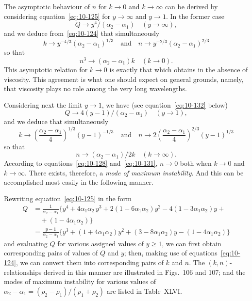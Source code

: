 The asymptotic behaviour of $n$ for $k \to 0$ and $k \to \infty$ can be derived by considering equation~\eqref{eq:10-125} for $y \to \infty$ and $y \to 1$. In the former case
\begin{equation}
\label{eq:10-126}
Q \to y^4/(\alpha_2-\alpha_1) \quad (y \to \infty),
\end{equation}
and we deduce from~\eqref{eq:10-124} that simultaneously
\begin{equation}
\label{eq:10-127}
k \to y^{-4/3}(\alpha_2-\alpha_1)^{1/3} \quad\text{and}\quad n \to y^{-2/3}(\alpha_2-\alpha_1)^{2/3}
\end{equation}
so that
\begin{equation}
\label{eq:10-128}
n^3 \to (\alpha_2-\alpha_1)k \quad (k \to 0).
\end{equation}
This asymptotic relation for $k \to 0$ is exactly that which obtains in the absence of viscosity. This agreement is what one should expect on general grounds, namely, that viscosity plays no role among the very long wavelengths.

Considering next the limit $y \to 1$, we have (see equation~\eqref{eq:10-132} below)
\begin{equation}
\label{eq:10-129}
Q \to 4(y-1)/(\alpha_2-\alpha_1) \quad (y \to 1),
\end{equation}
and we deduce that simultaneously
\begin{equation}
\label{eq:10-130}
k \to \left(\frac{\alpha_2-\alpha_1}{4}\right)^{1/3}\!(y-1)^{-1/3} \quad\text{and}\quad n \to 2\!\left(\frac{\alpha_2-\alpha_1}{4}\right)^{2/3}\!(y-1)^{1/3}
\end{equation}
so that
\begin{equation}
\label{eq:10-131}
n \to (\alpha_2-\alpha_1)/2k \quad (k \to \infty).
\end{equation}
According to equations~\eqref{eq:10-128} and~\eqref{eq:10-131}, $n \to 0$ both when $k \to 0$ and $k \to \infty$. There exists, therefore, a \emph{mode of maximum instability}. And this can be accomplished most easily in the following manner.

Rewriting equation~\eqref{eq:10-125} in the form
\begin{align}
\label{eq:10-132}
Q &= \frac{1}{\alpha_2-\alpha_1}\{y^4+4\alpha_1\alpha_2\,y^3+2(1-6\alpha_1\alpha_2)y^2 - 4(1-3\alpha_1\alpha_2)y + {} \nonumber\\
&\quad {}+ (1-4\alpha_1\alpha_2)\} \nonumber\\
&= \frac{y-1}{\alpha_2-\alpha_1}\{y^3+(1+4\alpha_1\alpha_2)y^2+(3-8\alpha_1\alpha_2)y - (1-4\alpha_1\alpha_2)\}
\end{align}
and evaluating $Q$ for various assigned values of $y \geqslant 1$, we can first obtain corresponding pairs of values of $Q$ and $y$; then, making use of equations~\eqref{eq:10-124}, we can convert them into corresponding pairs of $k$ and $n$. The $(k,n)$-relationships derived in this manner are illustrated in Figs.~106 and 107; and the modes of maximum instability for various values of $\alpha_2-\alpha_1 = (\rho_2-\rho_1)/(\rho_1+\rho_2)$ are listed in Table~XLVI.

